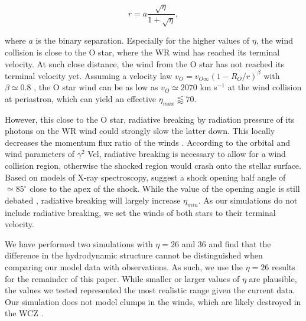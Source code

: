 \documentclass[usenatbib]{mnras}%
\begin{document}
\begin{equation}
  \label{eq:standoff}
  r=a\frac{\sqrt{\eta}}{1+\sqrt{\eta}},
\end{equation}



where $a$ is the binary separation. Especially for the higher values of $\eta$, the wind collision is close to the O star, where the WR wind has reached its terminal velocity. At such close distance, the wind from the O star has not reached its terminal velocity yet.  Assuming a velocity law  $v_O=v_{O\infty}(1-R_O/r)^{\beta}$ with $\beta\simeq 0.8$ \citep{1996A&A...305..171P}, the O star wind can be as low as  $v_O\simeq 2070$ km s$^{-1}$ at the wind collision at periastron, which can yield an effective $\eta_{max} \lessapprox 70$.

However, this close to the O star, radiative breaking by radiation pressure of its photons on the WR wind could strongly slow the latter down. This locally  decreases the momentum flux ratio of the winds \citep{1997ApJ...475..786G}. According to the orbital and wind parameters of $\gamma^2$ Vel, radiative breaking is necessary  to allow for a wind collision region, otherwise the shocked region would crash onto the stellar surface. Based on models of X-ray spectroscopy,  \citet{2005MNRAS.356.1308H} suggest a shock opening half angle of $\simeq 85^{\circ}$ close to the apex of the shock.  While the value of the opening angle is still debated \citep[see e.g.][]{2000MNRAS.316..129R}, radiative breaking will largely increase $\eta_{min}$. As our simulations do not include radiative breaking, we set the winds of both stars to their terminal velocity. 

We have performed two simulations with $\eta=26$ and 36  and find that the difference in the hydrodynamic structure cannot be distinguished when comparing our model data with observations. As such, we use the $\eta=26$ results for the remainder of this paper.  While smaller or larger values of $\eta$ are plausible, the values we tested represented the most realistic range given the current data. Our simulation does not model clumps in the winds, which are likely destroyed in the WCZ \citep{2007ApJ...660L.141P}.
\end{document}
